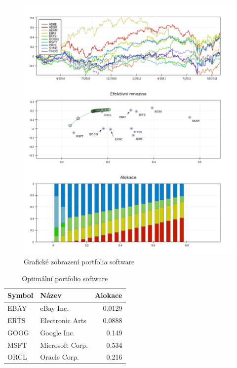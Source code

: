 \documentclass[a4paper,12pt]{report}
\begin{document}
    \begin{figure}[htb]
      \centering
        \includegraphics[height=0.95\textheight]{sw1.png}
       \caption{Grafické zobrazení portfolia software}
    \end{figure}

    \begin{table}[htb]
      \centering
      \begin{tabular}{|l|l|r|}
        \hline
        Symbol&Název&Alokace\\\hline\hline
        EBAY&eBay Inc. &0.0129\\\hline
        ERTS&Electronic Arts &0.0888\\\hline
        GOOG&Google Inc. &0.149\\\hline
        MSFT&Microsoft Corp. &0.534\\\hline
        ORCL&Oracle Corp. &0.216\\\hline
      \end{tabular}
      \caption{Optimální portfolio software}
    \end{table}

  \clearpage
\end{document}
